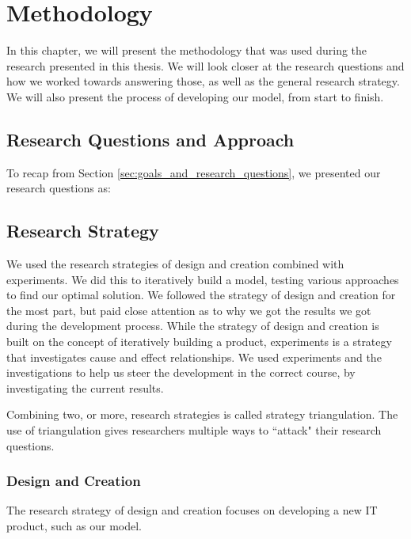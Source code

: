 
\chapter{Methodology}
\label{ch:methodology}
In this chapter, we will present the methodology that was used during the research presented in this thesis. We will look closer at the research questions and how we worked towards answering those, as well as the general research strategy. We will also present the process of developing our model, from start to finish.


\section{Research Questions and Approach}
\label{sec:research_questions_and_approach}
To recap from Section \ref{sec:goals_and_research_questions}, we presented our research questions as:




\section{Research Strategy}
We used the research strategies of design and creation combined with experiments. We did this to iteratively build a model, testing various approaches to find our optimal solution. We followed the strategy of design and creation for the most part, but paid close attention as to why we got the results we got during the development process. While the strategy of design and creation is built on the concept of iteratively building a product, experiments is a strategy that investigates cause and effect relationships. We used experiments and the investigations to help us steer the development in the correct course, by investigating the current results.

Combining two, or more, research strategies is called strategy triangulation. The use of triangulation gives researchers multiple ways to ``attack" their research questions. 

\subsection{Design and Creation}
The research strategy of design and creation focuses on developing a new IT product, such as our model.

